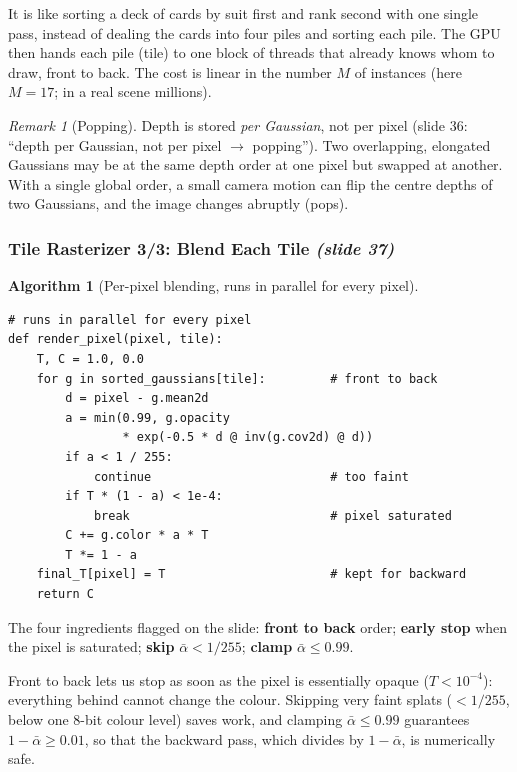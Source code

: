 \documentclass[11pt,a4paper]{article}
\newcommand{\sr}[1]{\texorpdfstring{\emph{(#1)}}{(#1)}}
\newcommand{\abar}{\bar\alpha}
\theoremstyle{definition}
\newtheorem{algorithm}{Algorithm}[section]
\theoremstyle{plain}
\theoremstyle{remark}
\newtheorem{remark}[definition]{Remark}
\begin{document}
\begin{intuition}
It is like sorting a deck of cards by suit first and rank second with one single pass, instead of dealing the cards into four piles and sorting each pile. The GPU then hands each pile (tile) to one block of threads that already knows whom to draw, front to back. The cost is linear in the number $M$ of instances (here $M=17$; in a real scene millions).
\end{intuition}

\begin{remark}[Popping]
Depth is stored \emph{per Gaussian}, not per pixel (slide 36: ``depth per Gaussian, not per pixel $\to$ popping''). Two overlapping, elongated Gaussians may be at the same depth order at one pixel but swapped at another. With a single global order, a small camera motion can flip the centre depths of two Gaussians, and the image changes abruptly (pops).
\end{remark}

\subsubsection{Tile Rasterizer 3/3: Blend Each Tile \sr{slide 37}}
\begin{algorithm}[Per-pixel blending, runs in parallel for every pixel]
\begin{lstlisting}
# runs in parallel for every pixel
def render_pixel(pixel, tile):
    T, C = 1.0, 0.0
    for g in sorted_gaussians[tile]:         # front to back
        d = pixel - g.mean2d
        a = min(0.99, g.opacity
                * exp(-0.5 * d @ inv(g.cov2d) @ d))
        if a < 1 / 255:
            continue                         # too faint
        if T * (1 - a) < 1e-4:
            break                            # pixel saturated
        C += g.color * a * T
        T *= 1 - a
    final_T[pixel] = T                       # kept for backward
    return C
\end{lstlisting}
\end{algorithm}
The four ingredients flagged on the slide: \textbf{front to back} order; \textbf{early stop} when the pixel is saturated; \textbf{skip} $\abar<1/255$; \textbf{clamp} $\abar\le0.99$.

\begin{intuition}
Front to back lets us stop as soon as the pixel is essentially opaque ($T<10^{-4}$): everything behind cannot change the colour. Skipping very faint splats ($<1/255$, below one 8-bit colour level) saves work, and clamping $\abar\le0.99$ guarantees $1-\abar\ge0.01$, so that the backward pass, which divides by $1-\abar$, is numerically safe.
\end{intuition}
\end{document}
